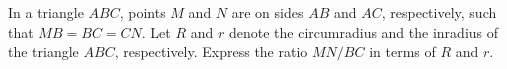 In a triangle $ABC$, points $M$ and $N$ are on sides $AB$ and $AC$, respectively, such that $MB = BC = CN$. Let $R$ and $r$ denote the circumradius and the inradius of the triangle $ABC$, respectively. Express the ratio $MN/BC$ in terms of $R$ and $r$.